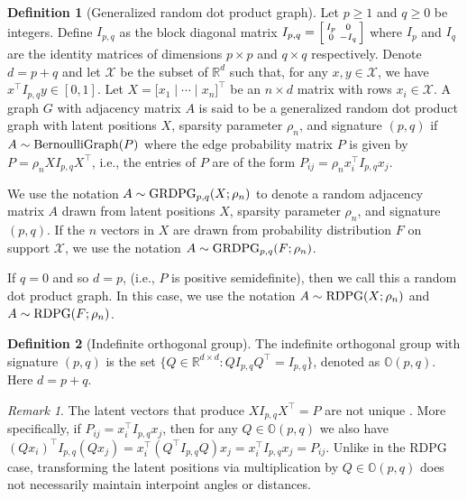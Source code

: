 \documentclass[
  12pt,
]{article}
\theoremstyle{definition}
\newtheorem{definition}{Definition}[section]
\theoremstyle{definition}
\theoremstyle{definition}
\theoremstyle{definition}
\theoremstyle{remark}
\newtheorem{remark}{Remark}
\begin{document}
\begin{definition}[Generalized random dot product graph]
\label{def:grdpg}
Let $p \geq 1$ and $q \geq 0$ be integers. 
Define $I_{p,q}$ as the block diagonal matrix $I_{p,q} = \Bigl[\begin{smallmatrix} I_{p} & 0 \\ 0 & - I_{q} \end{smallmatrix} \Bigr]$ where $I_p$ and $I_q$ are the identity matrices of dimensions $p \times p$ and $q \times q$ respectively. 
Denote $d = p + q$ and let $\mathcal{X}$ be the subset of $\mathbb{R}^d$ such that, for any $x, y \in \mathcal{X}$, we have $x^\top I_{p,q} y \in [0, 1]$. 
Let $X = \Big[ x_1 \mid \cdots \mid x_n \Big]^\top$ be an $n \times d$ matrix with rows $x_i \in \mathcal{X}$. 
A graph $G$ with adjacency matrix $A$ is said to be a generalized random dot product graph with latent positions $X$, sparsity parameter $\rho_n$, and signature $(p, q)$ if $A \sim \mathrm{BernoulliGraph}(P)$ where the edge probability matrix $P$ is given by $P = \rho_n X I_{p,q} X^\top$, i.e., the entries of $P$ are of the form $P_{ij} = \rho_n x_i^\top I_{p,q} x_j$. 

We use the notation $A \sim \mathrm{GRDPG}_{p,q}(X; \rho_n)$ to denote a random adjacency matrix $A$ drawn from latent positions $X$, sparsity parameter $\rho_n$, and signature $(p, q)$. If the $n$ vectors in $X$ are drawn from probability distribution $F$ on support $\mathcal{X}$, we use the notation $A \sim \mathrm{GRDPG}_{p,q}(F; \rho_n)$. 

If $q = 0$ and so $d = p$, (i.e., $P$ is positive semidefinite), then we call this a random dot product graph. 
In this case, we use the notation $A \sim \mathrm{RDPG}(X; \rho_n)$ and $A \sim \mathrm{RDPG}(F; \rho_n)$. 
\end{definition}

\begin{definition}[Indefinite orthogonal group]
\label{def:indefinite}
The indefinite orthogonal group with signature $(p, q)$ is
the set $\{Q \in \mathbb{R}^{d \times d} \colon Q I_{p, q} Q^{\top} = I_{p, q}\}$,
denoted as $\mathbb{O}(p, q)$. Here $d = p + q$. 
\end{definition}

\begin{remark}
\label{rem:non_identifiable}
The latent vectors that produce $X I_{p,q} X^\top = P$ are not unique
\citep{rubindelanchy2017statistical}.
More specifically, if $P_{ij} = x_i^\top I_{p, q} x_j$, then for any $Q \in \mathbb{O}(p, q)$ we also have 
$(Q x_i)^\top I_{p, q} (Q x_j) = x_i^\top (Q^\top I_{p, q} Q) x_j = x_i^\top I_{p, q} x_j = P_{ij}$. 
Unlike in the RDPG case, transforming the latent positions via multiplication by $Q \in \mathbb{O}(p, q)$ does not necessarily maintain interpoint angles or distances.
\end{remark}
\end{document}

